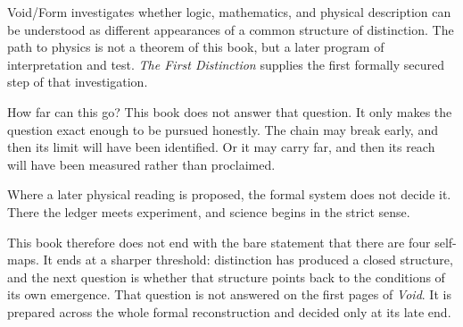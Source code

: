 \documentclass[11pt,a4paper]{book}
\begin{document}
Void/Form investigates whether logic, mathematics, and physical description
can be understood as different appearances of a common structure of
distinction. The path to physics is not a theorem of this book, but a later
program of interpretation and test. \textit{The First Distinction} supplies
the first formally secured step of that investigation.

How far can this go? This book does not answer that question. It only makes
the question exact enough to be pursued honestly. The chain may break
early, and then its limit will have been identified. Or it may carry far,
and then its reach will have been measured rather than proclaimed.

Where a later physical reading is proposed, the formal system does not
decide it. There the ledger meets experiment, and science begins in the
strict sense.

This book therefore does not end with the bare statement that there are four
self-maps. It ends at a sharper threshold: distinction has produced a
closed structure, and the next question is whether that structure points
back to the conditions of its own emergence. That question is not answered
on the first pages of \textit{Void}. It is prepared across the whole formal
reconstruction and decided only at its late end.
\end{document}
